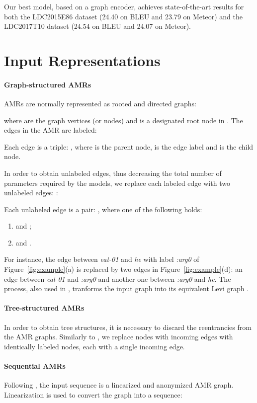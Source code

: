 \documentclass[11pt,a4paper]{article}
\begin{document}
Our best model, based on a graph encoder, achieves state-of-the-art results for both the LDC2015E86 dataset (24.40 on BLEU and 23.79 on Meteor) and the LDC2017T10 dataset (24.54 on BLEU and 24.07 on Meteor).

\section{Input Representations}
\label{sec:input}

\paragraph{Graph-structured AMRs}
AMRs are normally represented as rooted and directed graphs:

\noindent where  are the graph vertices (or nodes) and  is a designated root node in . The edges in the AMR are labeled:

Each edge  is a triple: , where  is the parent node,  is the edge label and  is the child node.

In order to obtain unlabeled edges, thus decreasing the total number of parameters required by the models, we replace each labeled edge  with two unlabeled edges: :

Each unlabeled edge  is a pair: ,
where one of the following holds:
\begin{enumerate}
\item  and ;
\item  and .
\end{enumerate}

For instance, the edge between \emph{eat-01} and \emph{he} with label \emph{:arg0} of Figure~\ref{fig:example}(a) is replaced by two edges in Figure~\ref{fig:example}(d): an edge between \emph{eat-01} and \emph{:arg0} and another one between \emph{:arg0} and \emph{he}.
The process, also used in , tranforms the input graph into its equivalent Levi graph \cite{levi1942finite}. 

\paragraph{Tree-structured AMRs} 
In order to obtain tree structures, it is necessary to discard the reentrancies from the AMR graphs. 
Similarly to , we replace nodes with  incoming edges with  identically labeled nodes, each with a single incoming edge.




\paragraph{Sequential AMRs} Following , the input sequence is a linearized and anonymized AMR graph. Linearization is used to convert the graph into a sequence:
\end{document}
